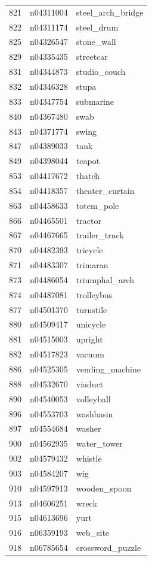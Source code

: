 \begin{table}
\begin{tabular}{cll}
821 & n04311004 & steel_arch_bridge \\
822 & n04311174 & steel_drum \\
825 & n04326547 & stone_wall \\
829 & n04335435 & streetcar \\
831 & n04344873 & studio_couch \\
832 & n04346328 & stupa \\
833 & n04347754 & submarine \\
840 & n04367480 & swab \\
843 & n04371774 & swing \\
847 & n04389033 & tank \\
849 & n04398044 & teapot \\
853 & n04417672 & thatch \\
854 & n04418357 & theater_curtain \\
863 & n04458633 & totem_pole \\
866 & n04465501 & tractor \\
867 & n04467665 & trailer_truck \\
870 & n04482393 & tricycle \\
871 & n04483307 & trimaran \\
873 & n04486054 & triumphal_arch \\
874 & n04487081 & trolleybus \\
877 & n04501370 & turnstile \\
880 & n04509417 & unicycle \\
881 & n04515003 & upright \\
882 & n04517823 & vacuum \\
886 & n04525305 & vending_machine \\
888 & n04532670 & viaduct \\
890 & n04540053 & volleyball \\
896 & n04553703 & washbasin \\
897 & n04554684 & washer \\
900 & n04562935 & water_tower \\
902 & n04579432 & whistle \\
903 & n04584207 & wig \\
910 & n04597913 & wooden_spoon \\
913 & n04606251 & wreck \\
915 & n04613696 & yurt \\
916 & n06359193 & web_site \\
918 & n06785654 & crossword_puzzle \\

\end{tabular}
\end{table}
